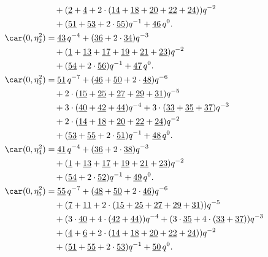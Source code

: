 \begin{align*}
	&\quad+(\underline{2}+\underline{4}+2\cdot(\underline{14}+\underline{18}+\underline{20}+\underline{22}+\underline{24}))q^{-2}\\
	&\quad+(\underline{51}+\underline{53}+2\cdot\underline{55})q^{-1}+\underline{46}\,q^0.\\
	\car(0,\eta^{2}_{2})
	&=\underline{43}\,q^{-4}+(\underline{36}+2\cdot\underline{34})q^{-3}\\
	&\quad+(\underline{1}+\underline{13}+\underline{17}+\underline{19}+\underline{21}+\underline{23})q^{-2}\\
	&\quad+(\underline{54}+2\cdot\underline{56})q^{-1}+\underline{47}\,q^0.\\
	\car(0,\eta^{2}_{3})
	&=\underline{51}\,q^{-7}+(\underline{46}+\underline{50}+2\cdot\underline{48})q^{-6}\\
	&\quad+2\cdot(\underline{15}+\underline{25}+\underline{27}+\underline{29}+\underline{31})q^{-5}\\
	&\quad+3\cdot(\underline{40}+\underline{42}+\underline{44})q^{-4}+3\cdot(\underline{33}+\underline{35}+\underline{37})q^{-3}\\
	&\quad+2\cdot(\underline{14}+\underline{18}+\underline{20}+\underline{22}+\underline{24})q^{-2}\\
	&\quad+(\underline{53}+\underline{55}+2\cdot\underline{51})q^{-1}+\underline{48}\,q^0.\\
	\car(0,\eta^{2}_{4})
	&=\underline{41}\,q^{-4}+(\underline{36}+2\cdot\underline{38})q^{-3}\\
	&\quad+(\underline{1}+\underline{13}+\underline{17}+\underline{19}+\underline{21}+\underline{23})q^{-2}\\
	&\quad+(\underline{54}+2\cdot\underline{52})q^{-1}+\underline{49}\,q^0.\\
	\car(0,\eta^{2}_{5})
	&=\underline{55}\,q^{-7}+(\underline{48}+\underline{50}+2\cdot\underline{46})q^{-6}\\
	&\quad+(\underline{7}+\underline{11}+2\cdot(\underline{15}+\underline{25}+\underline{27}+\underline{29}+\underline{31}))q^{-5}\\
	&\quad+(3\cdot\underline{40}+4\cdot(\underline{42}+\underline{44}))q^{-4}+(3\cdot\underline{35}+4\cdot(\underline{33}+\underline{37}))q^{-3}\\
	&\quad+(\underline{4}+\underline{6}+2\cdot(\underline{14}+\underline{18}+\underline{20}+\underline{22}+\underline{24}))q^{-2}\\
	&\quad+(\underline{51}+\underline{55}+2\cdot\underline{53})q^{-1}+\underline{50}\,q^0.\\

\end{align*}
